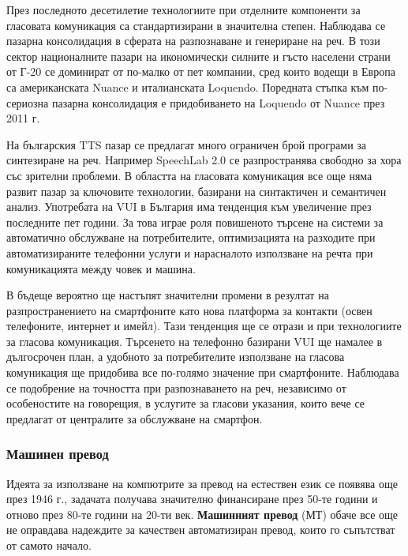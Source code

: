\begin{multicols}{2}
  През последното десетилетие технологиите при отделните компоненти за гласовата комуникация са стандартизирани в значителна степен. Наблюдава се пазарна консолидация в сферата на разпознаване и генериране на реч. В този сектор националните пазари на икономически силните и гъсто населени страни от Г-20 се доминират от по-малко от пет компании, сред които водещи в Европа са американската Nuance и италианската Loquendo. Поредната стъпка към по-сериозна пазарна консолидация  е придобиването на Loquendo от Nuance през 2011 г.

  На българския TTS пазар се предлагат много ограничен брой програми за синтезиране на реч. Например SpeechLab 2.0 се разпространява свободно за хора със зрителни проблеми. В областта на  гласовата комуникация все още няма развит пазар за ключовите технологии, базирани на синтактичен и семантичен анализ.
  Употребата на VUI в България има тенденция към увеличение през последните пет години. За това играе роля повишеното търсене на системи за автоматично
   обслужване на потребителите, оптимизацията на
   разходите при автоматизираните телефонни услуги и
   нарасналото използване на речта при комуникацията между човек и
  машина.

  В бъдеще вероятно ще настъпят значителни промени в
   резултат на разпространението на смартфоните като
   нова платформа за контакти (освен телефоните, интернет и имейл).
  Тази тенденция ще се отрази и при технологиите за
   гласова комуникация. Търсенето на
   телефонно базирани VUI ще намалее в дългосрочен
   план, а удобното за потребителите използване на гласова комуникация ще придобива все по-голямо значение при смартфоните. Наблюдава се подобрение на
   точността при разпознаването на реч, независимо от особеностите на
   говорещия, в услугите за гласови указания, които вече се предлагат от централите за обслужване на смартфон.

  \subsubsection{Машинен превод}

  Идеята за използване на компютрите за превод
   на естествен език се появява още през 1946 г.,
   задачата получава значително финансиране през 50-те години и отново през 80-те години на 20-ти век. \textbf{Машинният превод} (МТ) обаче все още не оправдава надеждите за качествен автоматизиран превод, които го съпътстват от самото начало.



\end{multicols}
